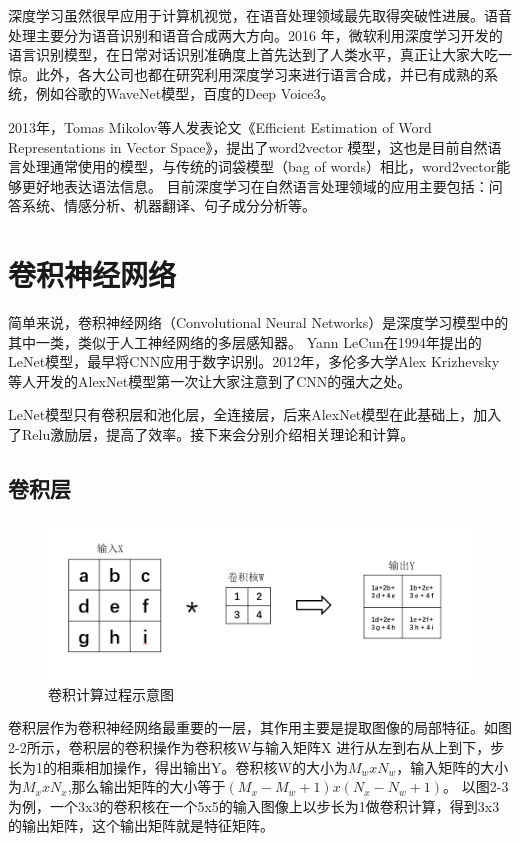 深度学习虽然很早应用于计算机视觉，在语音处理领域最先取得突破性进展。语音处理主要分为语音识别和语音合成两大方向。2016 年，微软利用深度学习开发的语言识别模型，在日常对话识别准确度上首先达到了人类水平，真正让大家大吃一惊。此外，各大公司也都在研究利用深度学习来进行语言合成，并已有成熟的系统，例如谷歌的WaveNet模型，百度的Deep Voice3。

2013年，Tomas Mikolov等人发表论文《Efficient Estimation of Word Representations in Vector Space》，提出了word2vector 模型，这也是目前自然语言处理通常使用的模型，与传统的词袋模型（bag of words）相比，word2vector能够更好地表达语法信息。
目前深度学习在自然语言处理领域的应用主要包括：问答系统、情感分析、机器翻译、句子成分分析等。
\section{卷积神经网络}

简单来说，卷积神经网络（Convolutional Neural Networks）是深度学习模型中的其中一类，类似于人工神经网络的多层感知器。
Yann LeCun在1994年提出的LeNet模型，最早将CNN应用于数字识别。2012年，多伦多大学Alex Krizhevsky等人开发的AlexNet模型第一次让大家注意到了CNN的强大之处。

LeNet模型只有卷积层和池化层，全连接层，后来AlexNet模型在此基础上，加入了Relu激励层，提高了效率。接下来会分别介绍相关理论和计算。

\subsection{卷积层}
\begin{figure}[h]
\begin{center}
\includegraphics[width=1\textwidth]{figures/CNN1.png}
\end{center}
\vspace{-5mm}
\caption{卷积计算过程示意图}
\end{figure}

卷积层作为卷积神经网络最重要的一层，其作用主要是提取图像的局部特征。如图2-2所示，卷积层的卷积操作为卷积核W与输入矩阵X 进行从左到右从上到下，步长为1的相乘相加操作，得出输出Y。卷积核W的大小为$M_w x N_w$，输入矩阵的大小为$M_x x N_x$,那么输出矩阵的大小等于$(M_x-M_w+1)x(N_x-N_w+1)$。
以图2-3为例，一个3x3的卷积核在一个5x5的输入图像上以步长为1做卷积计算，得到3x3的输出矩阵，这个输出矩阵就是特征矩阵。

